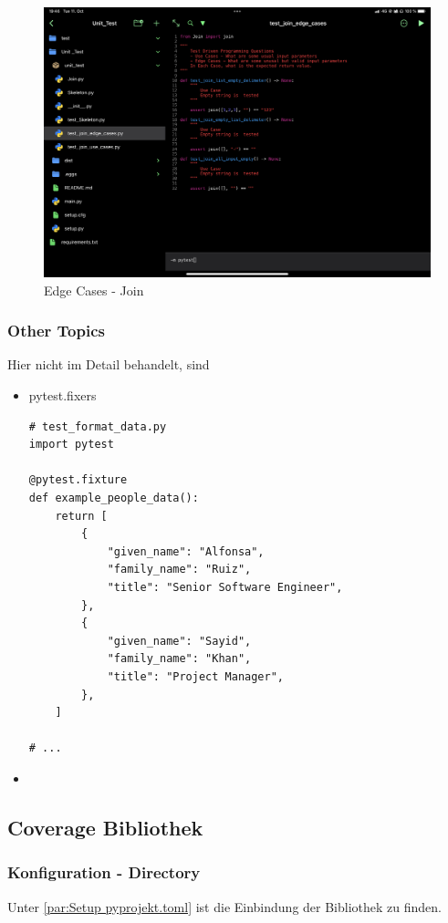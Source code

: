 \begin{figure}[H]
	\centering
	\includegraphics[scale = 0.6]{attachment/chapter_2/Scc091}
	\caption{Edge Cases - Join}
\end{figure}

\subsubsection{Other Topics}
Hier nicht im Detail behandelt, sind
\begin{itemize}
	\item pytest.fixers 
	\begin{lstlisting}[style=python]
# test_format_data.py
import pytest

@pytest.fixture
def example_people_data():
    return [
        {
            "given_name": "Alfonsa",
            "family_name": "Ruiz",
            "title": "Senior Software Engineer",
        },
        {
            "given_name": "Sayid",
            "family_name": "Khan",
            "title": "Project Manager",
        },
    ]

# ...
	\end{lstlisting}
	\item 
\end{itemize} 

\subsection{Coverage Bibliothek}
\subsubsection{Konfiguration - Directory}
Unter \ref{par:Setup pyprojekt.toml} ist die Einbindung der Bibliothek zu finden. 

